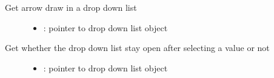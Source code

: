 \documentclass[letterpaper,10pt,english]{sphinxmanual}
\begin{document}

\begin{fulllineitems}
\label{\detokenize{object-types/ddlist:_CPPv424lv_ddlist_get_draw_arrowP8lv_obj_t}}%
\pysigstartmultiline
{}\label{\detokenize{object-types/ddlist:lv__ddlist_8h_1a5529856b2dd297be4f0a97c7171a7946}}%
\pysigstopmultiline
Get arrow draw in a drop down list \begin{description}
\item[{}] \leavevmode\begin{itemize}
\item {} 
: pointer to drop down list object 

\end{itemize}

\end{description}


\end{fulllineitems}


\begin{fulllineitems}
\label{\detokenize{object-types/ddlist:_CPPv423lv_ddlist_get_stay_openP8lv_obj_t}}%
\pysigstartmultiline
{}\label{\detokenize{object-types/ddlist:lv__ddlist_8h_1aa109c8544d082a8aeed4041dc7abc7a3}}%
\pysigstopmultiline
Get whether the drop down list stay open after selecting a value or not \begin{description}
\item[{}] \leavevmode\begin{itemize}
\item {} 
: pointer to drop down list object 

\end{itemize}

\end{description}


\end{fulllineitems}
\end{document}

